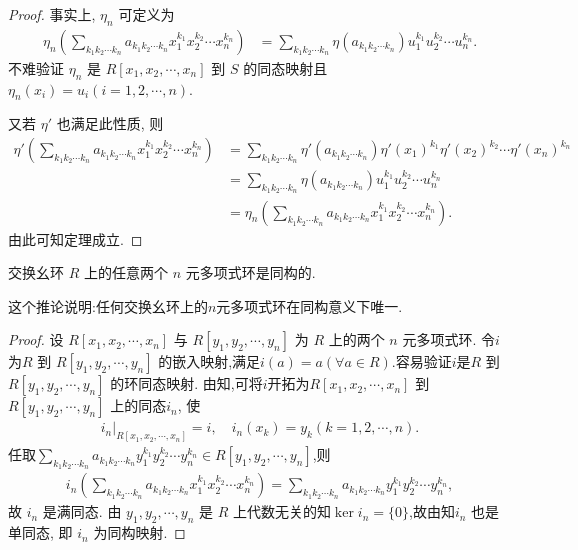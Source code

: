 \documentclass[../../main.tex]{subfiles}%
\begin{document}
\begin{proof}
事实上, \( \eta_n \) 可定义为
\begin{align*}
\eta_n \left( \sum_{k_1 k_2 \cdots k_n} a_{k_1 k_2 \cdots k_n} x_1^{k_1} x_2^{k_2} \cdots x_n^{k_n} \right) &= \sum_{k_1 k_2 \cdots k_n} \eta(a_{k_1 k_2 \cdots k_n}) u_1^{k_1} u_2^{k_2} \cdots u_n^{k_n}.
\end{align*}
不难验证 \( \eta_n \) 是 \( R[x_1, x_2, \cdots, x_n] \) 到 \( S \) 的同态映射且 \( \eta_n(x_i) = u_i (i = 1, 2, \cdots, n) \).

又若 \( \eta' \) 也满足此性质, 则
\begin{align*}
\eta' \left( \sum_{k_1 k_2 \cdots k_n} a_{k_1 k_2 \cdots k_n} x_1^{k_1} x_2^{k_2} \cdots x_n^{k_n} \right) &= \sum_{k_1 k_2 \cdots k_n} \eta'(a_{k_1 k_2 \cdots k_n}) \eta'(x_1)^{k_1} \eta'(x_2)^{k_2} \cdots \eta'(x_n)^{k_n} \\
&= \sum_{k_1 k_2 \cdots k_n} \eta(a_{k_1 k_2 \cdots k_n}) u_1^{k_1} u_2^{k_2} \cdots u_n^{k_n} \\
&= \eta_n \left( \sum_{k_1 k_2 \cdots k_n} a_{k_1 k_2 \cdots k_n} x_1^{k_1} x_2^{k_2} \cdots x_n^{k_n} \right).
\end{align*}
由此可知定理成立.
\end{proof}

\begin{corollary}
交换幺环 \( R \) 上的任意两个 \( n \) 元多项式环是同构的.
\end{corollary}
\begin{note}
这个推论说明:任何交换幺环上的$n$元多项式环在同构意义下唯一.
\end{note}
\begin{proof}
设 \( R[x_1, x_2, \cdots, x_n] \) 与 \( R[y_1, y_2, \cdots, y_n] \) 为 \( R \) 上的两个 \( n \) 元多项式环. 令$i$为\( R \) 到 \( R[y_1, y_2, \cdots, y_n] \) 的嵌入映射,满足\( i(a) = a (\forall a \in R) \).容易验证$i$是\( R \) 到 \( R[y_1, y_2, \cdots, y_n] \) 的环同态映射.
由知,可将$i$开拓为\( R[x_1, x_2, \cdots, x_n] \) 到 \( R[y_1, y_2, \cdots, y_n] \) 上的同态\( i_n \), 使 
\begin{align*}
i_n|_{R[x_1, x_2, \cdots, x_n]} = i ,\quad i_n(x_k) = y_k (k = 1, 2, \cdots, n).
\end{align*}
任取$\sum_{k_1 k_2 \cdots k_n} a_{k_1 k_2 \cdots k_n} y_1^{k_1} y_2^{k_2} \cdots y_n^{k_n} \in  R[y_1, y_2, \cdots, y_n]$,则
\begin{align*}
i_n \left( \sum_{k_1 k_2 \cdots k_n} a_{k_1 k_2 \cdots k_n} x_1^{k_1} x_2^{k_2} \cdots x_n^{k_n} \right) = \sum_{k_1 k_2 \cdots k_n} a_{k_1 k_2 \cdots k_n} y_1^{k_1} y_2^{k_2} \cdots y_n^{k_n},
\end{align*}
故 \( i_n \) 是满同态. 由 \( y_1, y_2, \cdots, y_n \) 是 \( R \) 上代数无关的知$\ker i_n=\{0\}$,故由知\( i_n \) 也是单同态, 即 \( i_n \) 为同构映射.
\end{proof}
\end{document}
